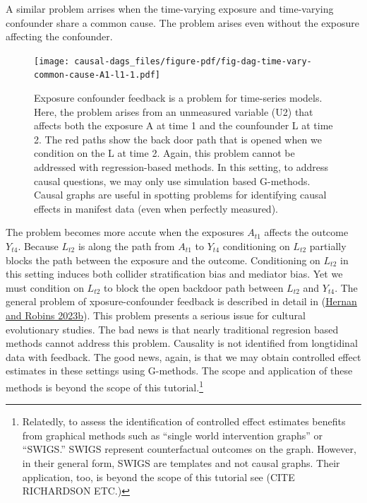 \documentclass[
  singlecolumn]{report}
\begin{document}
A similar problem arrises when the time-varying exposure and
time-varying confounder share a common cause. The problem arises even
without the exposure affecting the confounder.

\begin{figure}

{\centering \texttt{[image: causal-dags\_files/figure-pdf/fig-dag-time-vary-common-cause-A1-l1-1.pdf]}

}

\caption{\label{fig-dag-time-vary-common-cause-A1-l1}Exposure confounder
feedback is a problem for time-series models. Here, the problem arises
from an unmeasured variable (U2) that affects both the exposure A at
time 1 and the counfounder L at time 2. The red paths show the back door
path that is opened when we condition on the L at time 2. Again, this
problem cannot be addressed with regression-based methods. In this
setting, to address causal questions, we may only use simulation based
G-methods. Causal graphs are useful in spotting problems for identifying
causal effects in manifest data (even when perfectly measured).}

\end{figure}

The problem becomes more accute when the exposures \(A_{t1}\) affects
the outcome \(Y_{t4}\). Because \(L_{t2}\) is along the path from
\(A_{t1}\) to \(Y_{t4}\) conditioning on \(L_{t2}\) partially blocks the
path between the exposure and the outcome. Conditioning on \(L_{t2}\) in
this setting induces both collider stratification bias and mediator
bias. Yet we must condition on \(L_{t2}\) to block the open backdoor
path between \(L_{t2}\) and \(Y_{t4}\). The general problem of
xposure-confounder feedback is described in detail in
(\protect\hyperlink{ref-hernan2023b}{Hernan and Robins 2023b}). This
problem presents a serious issue for cultural evolutionary studies. The
bad news is that nearly traditional regresion based methods cannot
address this problem. Causality is not identified from longtidinal data
with feedback. The good news, again, is that we may obtain controlled
effect estimates in these settings using G-methods. The scope and
application of these methods is beyond the scope of this
tutorial.\footnote{Relatedly, to assess the identification of controlled
  effect estimates benefits from graphical methods such as ``single
  world intervention graphs'' or ``SWIGS.'' SWIGS represent
  counterfactual outcomes on the graph. However, in their general form,
  SWIGS are templates and not causal graphs. Their application, too, is
  beyond the scope of this tutorial see (CITE RICHARDSON ETC.)}
\end{document}
